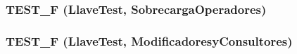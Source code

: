 \subsubsection{\setlength{\rightskip}{0pt plus 5cm}TEST\_\-F ({\bf LlaveTest}, SobrecargaOperadores)}\label{testllave_8cpp_c83985d09b7e7c4020497cf974522475}


\subsubsection{\setlength{\rightskip}{0pt plus 5cm}TEST\_\-F ({\bf LlaveTest}, ModificadoresyConsultores)}\label{testllave_8cpp_a65dbeacc97db56ce80fcb9c544f6755}


